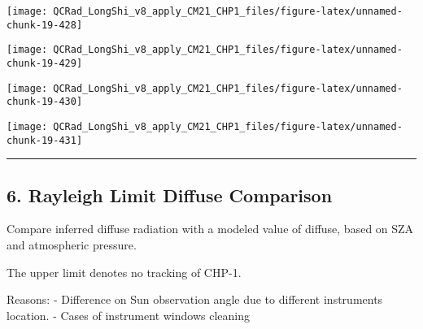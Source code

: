 \documentclass[
  10pt,
  a4paper,oneside]{article}
\begin{document}
\begin{center}\texttt{[image: QCRad\_LongShi\_v8\_apply\_CM21\_CHP1\_files/figure-latex/unnamed-chunk-19-428]} \end{center}

\begin{center}\texttt{[image: QCRad\_LongShi\_v8\_apply\_CM21\_CHP1\_files/figure-latex/unnamed-chunk-19-429]} \end{center}

\begin{center}\texttt{[image: QCRad\_LongShi\_v8\_apply\_CM21\_CHP1\_files/figure-latex/unnamed-chunk-19-430]} \end{center}

\begin{center}\texttt{[image: QCRad\_LongShi\_v8\_apply\_CM21\_CHP1\_files/figure-latex/unnamed-chunk-19-431]} \end{center}

\begin{center}\rule{0.5\linewidth}{0.5pt}\end{center}

\newpage

\hypertarget{rayleigh-limit-diffuse-comparison}{%
\subsection{6. Rayleigh Limit Diffuse Comparison}\label{rayleigh-limit-diffuse-comparison}}

Compare inferred diffuse radiation with a modeled value of diffuse,
based on SZA and atmospheric pressure.

The upper limit denotes no tracking of CHP-1.

Reasons:
- Difference on Sun observation angle due to different instruments location.
- Cases of instrument windows cleaning
\end{document}
